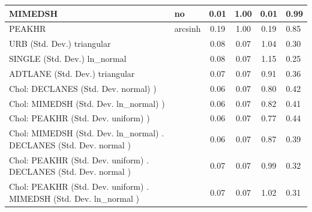\begin{table}
\begin{center}
\begin{tabular}{|l|l|c|c|c|l|}
			\hline
			MIMEDSH & no & 0.01 & 1.00 & 0.01 & 0.99 \\
			\hline
			PEAKHR & arcsinh & 0.19 & 1.00 & 0.19 & 0.85 \\
			\hline
			URB (Std. Dev.) triangular &  & 0.08 & 0.07 & 1.04 & 0.30 \\
			\hline
			SINGLE (Std. Dev.) ln_normal &  & 0.08 & 0.07 & 1.15 & 0.25 \\
			\hline
			ADTLANE (Std. Dev.) triangular &  & 0.07 & 0.07 & 0.91 & 0.36 \\
			\hline
			 Chol: DECLANES (Std. Dev. normal) ) &  & 0.06 & 0.07 & 0.80 & 0.42 \\
			\hline
			 Chol: MIMEDSH (Std. Dev. ln_normal) ) &  & 0.06 & 0.07 & 0.82 & 0.41 \\
			\hline
			 Chol: PEAKHR (Std. Dev. uniform) ) &  & 0.06 & 0.07 & 0.77 & 0.44 \\
			\hline
			 Chol: MIMEDSH (Std. Dev. ln_normal) . DECLANES (Std. Dev.   normal ) &  & 0.06 & 0.07 & 0.87 & 0.39 \\
			\hline
			 Chol: PEAKHR (Std. Dev. uniform) . DECLANES (Std. Dev.   normal ) &  & 0.07 & 0.07 & 0.99 & 0.32 \\
			\hline
			 Chol: PEAKHR (Std. Dev. uniform) . MIMEDSH (Std. Dev.   ln_normal ) &  & 0.07 & 0.07 & 1.02 & 0.31 \\
			\hline
		\end{tabular}
	\end{center}
\end{table}
